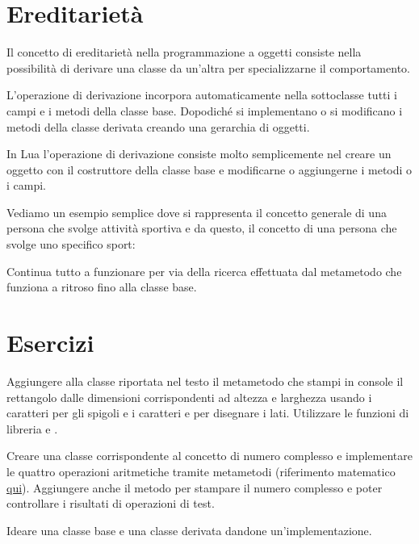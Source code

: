 \section{Ereditarietà}

Il concetto di ereditarietà nella programmazione a oggetti consiste nella
possibilità di derivare una classe da un'altra per specializzarne il
comportamento.

L'operazione di derivazione incorpora automaticamente nella sottoclasse tutti i
campi e i metodi della classe base. Dopodiché si implementano o si modificano i
metodi della classe derivata creando una gerarchia di oggetti.

In Lua l'operazione di derivazione consiste molto semplicemente nel creare un
oggetto con il costruttore della classe base e modificarne o aggiungerne i
metodi o i campi.

Vediamo un esempio semplice dove si rappresenta il concetto generale di una
persona che svolge attività sportiva e da questo, il concetto di una persona
che svolge uno specifico sport:

Continua tutto a funzionare per via della ricerca effettuata dal metametodo
 che funziona a ritroso fino alla classe base.


\section{Esercizi}

\begin{Exercise}[label=oop-01]
Aggiungere alla classe  riportata nel testo il metametodo
 che stampi in console il rettangolo dalle dimensioni
corrispondenti ad altezza e larghezza usando i caratteri \key{+} per gli
spigoli e i caratteri \key{-} e \key{|} per disegnare i lati. Utilizzare le
funzioni di libreria  e .
\end{Exercise}

\begin{Exercise}[label=oop-02]
Creare una classe corrispondente al concetto di numero complesso e implementare
le quattro operazioni aritmetiche tramite metametodi (riferimento matematico
\href{http://it.wikipedia.org/wiki/Numero_complesso#Operazioni_con_i_numeri_complessi}{qui}).
Aggiungere anche il metodo  per stampare il numero complesso e
poter controllare i risultati di operazioni di test.
\end{Exercise}

\begin{Exercise}[label=oop-03]
Ideare una classe base e una classe derivata dandone un'implementazione.
\end{Exercise}

